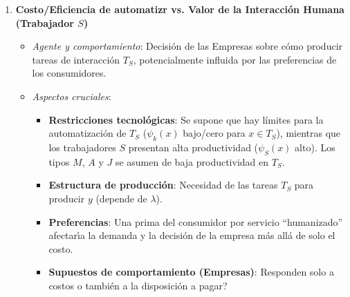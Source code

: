 \documentclass{article}
\theoremstyle{remark}
\theoremstyle{definition}
\begin{document}
\begin{enumerate}
\begin{tcolorbox}[title= Soluci\'on 2]
\begin{enumerate}
\begin{itemize}
\begin{itemize}
                    \item \textbf{Supuestos de comportamiento (Empresas)}: Se asume que las empresas optimizan y adoptan m\'etodos que reducen costos.
                    \item \textbf{Estructura de producci\'on}: La reasignaci\'on de tareas afecta la demanda laboral agregada $\Gamma_g$ y la productividad total $y$, seg\'un la funci\'on CES y el par\'ametro $\lambda$.
                  \end{itemize}
              \end{itemize}
            
              \item \textbf{Costo/Eficiencia de automatizr vs. Valor de la Interacci\'on Humana (Trabajador $S$)}
              \begin{itemize}
                \item \emph{Agente y comportamiento}: Decisi\'on de las Empresas sobre c\'omo producir tareas de interacci\'on $T_S$, potencialmente influida por las preferencias de los consumidores.
                \item \emph{Aspectos cruciales}:
                  \begin{itemize}
                    \item \textbf{Restricciones tecnol\'ogicas}: Se supone que hay l\'imites para la automatizaci\'on de $T_S$ ($\psi_k(x)$ bajo/cero para $x\in T_S$), mientras que los trabajadores $S$ presentan alta productividad ($\psi_S(x)$ alto). Los tipos $M$, $A$ y $J$ se asumen de baja productividad en $T_S$.
                    \item \textbf{Estructura de producci\'on}: Necesidad de las tareas $T_S$ para producir $y$ (depende de $\lambda$).
                    \item \textbf{Preferencias}: Una prima del consumidor por servicio ``humanizado'' afectar\'\i a la demanda y la decisi\'on de la empresa m\'as all\'a de solo el costo.
                    \item \textbf{Supuestos de comportamiento (Empresas)}: \textquestiondown Responden solo a costos o tambi\'en a la disposici\'on a pagar?
                  \end{itemize}
              \end{itemize}
            

\end{enumerate}
\end{tcolorbox}
\end{enumerate}
\end{document}
